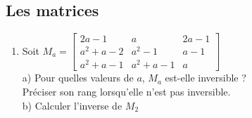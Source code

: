 \documentclass{article}
\begin{document}
\subsection{Les matrices}
\begin{enumerate}
\item Soit $M_a=\left[ 
\begin{array}{ccc}
2a-1 & a & 2a-1\\
a^2+a-2 & a^2-1 & a-1\\
a^2+a-1 & a^2+a-1 & a
\end{array}
\right]$\\
a) Pour quelles valeurs de $a$, $M_a$ est-elle inversible ?\\
Pr\'eciser son rang lorsqu'elle n'est pas inversible.\\
b) Calculer l'inverse de $M_2$


\end{enumerate}
\end{document}
